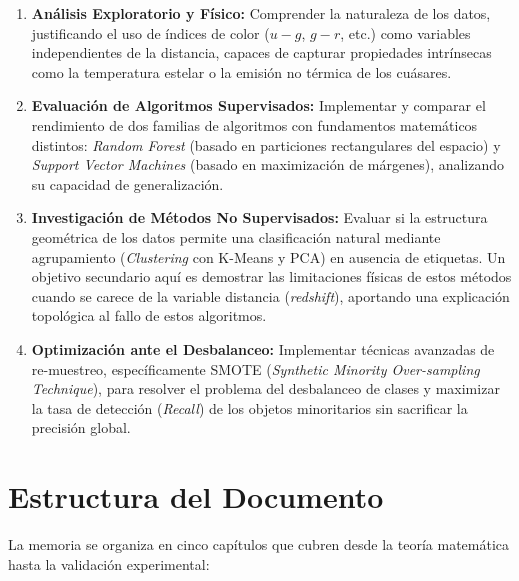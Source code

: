 \documentclass[12pt, a4paper]{report}
\begin{document}
\begin{enumerate}
    \item \textbf{Análisis Exploratorio y Físico:} Comprender la naturaleza de los datos, justificando el uso de índices de color ($u-g$, $g-r$, etc.) como variables independientes de la distancia, capaces de capturar propiedades intrínsecas como la temperatura estelar o la emisión no térmica de los cuásares.
    
    \item \textbf{Evaluación de Algoritmos Supervisados:} Implementar y comparar el rendimiento de dos familias de algoritmos con fundamentos matemáticos distintos: \textit{Random Forest} (basado en particiones rectangulares del espacio) y \textit{Support Vector Machines} (basado en maximización de márgenes), analizando su capacidad de generalización.
    
    \item \textbf{Investigación de Métodos No Supervisados:} Evaluar si la estructura geométrica de los datos permite una clasificación natural mediante agrupamiento (\textit{Clustering} con K-Means y PCA) en ausencia de etiquetas. Un objetivo secundario aquí es demostrar las limitaciones físicas de estos métodos cuando se carece de la variable distancia (\textit{redshift}), aportando una explicación topológica al fallo de estos algoritmos.
    
    \item \textbf{Optimización ante el Desbalanceo:} Implementar técnicas avanzadas de re-muestreo, específicamente SMOTE (\textit{Synthetic Minority Over-sampling Technique}), para resolver el problema del desbalanceo de clases y maximizar la tasa de detección (\textit{Recall}) de los objetos minoritarios sin sacrificar la precisión global.
\end{enumerate}

\section{Estructura del Documento}

La memoria se organiza en cinco capítulos que cubren desde la teoría matemática hasta la validación experimental:
\end{document}
